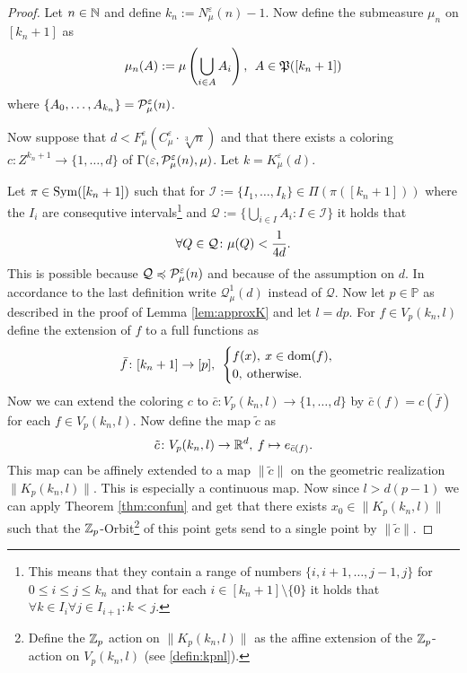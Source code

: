 \begin{proof}
  Let $n \in \N$ and define $k_n := N_\mu^\varepsilon(n) - 1$. Now define the submeasure $\mu_n$ on $[k_n+1]$ as \[\mu_n(A) := \mu\left(\bigcup\limits_{i\in A}A_i\right), \:\: A\in \PowS([k_n+1])\] where $\{A_0, \ldots, A_{k_n}\} = \P_\mu^\varepsilon(n)$.

  Now suppose that $d < F_\mu^\varepsilon(C_\mu^\varepsilon \cdot \sqrt[3]{n})$ and that there exists a coloring $c\colon Z^{k_n+1}\to \{1,\ldots, d\}$ of $\Gamma(\varepsilon, \P_\mu^\varepsilon(n), \mu)$. Let $k = K_\mu^\varepsilon(d)$.

  Let $\pi \in {\rm Sym}([k_n+1])$ such that for $\mathcal{I} := \{I_1, \ldots, I_k\} \in \Pi(\pi([k_n+1]))$ where the $I_i$ are consequtive intervals\footnote{This means that they contain a range of numbers $\{i, i+1, \ldots, j-1, j\}$ for $0\leq i \leq j \leq k_n$ and that for each $i \in [k_n+1]\setminus\{0\}$ it holds that $\forall k \in I_i\forall j\in I_{i+1}\colon k < j$.} and $\mathcal{Q} := \{\bigcup\limits_{i \in I} A_i\colon I \in \mathcal{I}\}$ it holds that \[\forall Q \in \mathcal{Q}\colon \mu(Q) < {1 \over 4d}.\] This is possible because $\mathcal{Q} \preccurlyeq \P_\mu^\varepsilon(n)$ and because of the assumption on $d$. In accordance to the last definition write $\mathcal{Q}^1_\mu(d)$ instead of $\mathcal{Q}$.
  Now let $p\in \mathbb{P}$ as described in the proof of Lemma \ref{lem:approxK} and let $l = dp$. For $f \in V_p(k_n,l)$ define the extension of $f$ to a full functions as
  \begin{equation*}
    \bar{f}\colon [k_n+1] \to [p], \:\: \begin{cases}
      f(x), \: x \in \dom(f), \\
      0, \: \text{otherwise}.
    \end{cases}
  \end{equation*}
  Now we can extend the coloring $c$ to $\bar{c}\colon V_p(k_n,l)\to \{1,\ldots,d\}$ by $\bar{c}(f) = c(\bar{f})$ for each $f \in V_p(k_n,l)$.
  Now define the map $\tilde{c}$ as
  \begin{equation*}
    \tilde{c}\colon V_p(k_n,l)\to \R^d, \: f \mapsto e_{\bar{c}(f)}.
  \end{equation*}
  This map can be affinely extended to a map $\lVert \tilde{c} \rVert$ on the geometric realization $\lVert K_p(k_n,l) \rVert$. This is especially a continuous map. Now since $l > d(p-1)$ we can apply Theorem \ref{thm:confun} and get that there exists $x_0 \in \lVert K_p(k_n, l) \rVert$ such that the $\Z_p$-Orbit\footnote{Define the $\Z_p$ action on $\lVert K_p(k_n, l)\rVert$ as the affine extension of the $\Z_p$-action on $V_p(k_n,l)$ (see \ref{defin:kpnl}).} of this point gets send to a single point by $\lVert \tilde{c} \rVert$. 


\end{proof}
